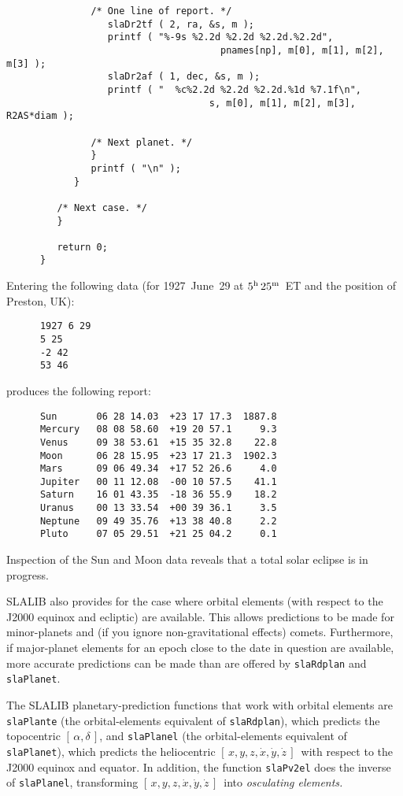 \documentclass[11pt,fleqn,twoside]{article}
\renewcommand{\_}{{\tt\char'137}}     %
\newcommand{\radec}     {$[\,\alpha,\delta\,]$}
\newcommand{\xyzxyzd}   {$[\,x,y,z,\dot{x},\dot{y},\dot{z}\,]$}
\begin{document}
\begin{verbatim}
               /* One line of report. */
                  slaDr2tf ( 2, ra, &s, m );
                  printf ( "%-9s %2.2d %2.2d %2.2d.%2.2d",
                                      pnames[np], m[0], m[1], m[2], m[3] );
                  slaDr2af ( 1, dec, &s, m );
                  printf ( "  %c%2.2d %2.2d %2.2d.%1d %7.1f\n",
                                    s, m[0], m[1], m[2], m[3], R2AS*diam );

               /* Next planet. */
               }
               printf ( "\n" );
            }

         /* Next case. */
         }

         return 0;
      }
\end{verbatim}
\vspace{-3ex}
\goodbreak
Entering the following data (for 1927~June~29 at $5^{\rm h}\,25^{\rm m}$~ET
and the position of Preston, UK):
\goodbreak
\vspace{-3ex}
\begin{verbatim}
      1927 6 29
      5 25
      -2 42
      53 46
\end{verbatim}
\vspace{-3ex}
\goodbreak
produces the following report:
\goodbreak
\vspace{-3ex}
\begin{verbatim}
      Sun       06 28 14.03  +23 17 17.3  1887.8
      Mercury   08 08 58.60  +19 20 57.1     9.3
      Venus     09 38 53.61  +15 35 32.8    22.8
      Moon      06 28 15.95  +23 17 21.3  1902.3
      Mars      09 06 49.34  +17 52 26.6     4.0
      Jupiter   00 11 12.08  -00 10 57.5    41.1
      Saturn    16 01 43.35  -18 36 55.9    18.2
      Uranus    00 13 33.54  +00 39 36.1     3.5
      Neptune   09 49 35.76  +13 38 40.8     2.2
      Pluto     07 05 29.51  +21 25 04.2     0.1
\end{verbatim}
\vspace{-3ex}
\goodbreak
Inspection of the Sun and Moon data reveals that
a total solar eclipse is in progress.
 
SLALIB also provides for the case where orbital elements (with respect
to the J2000 equinox and ecliptic)
are available.  This allows predictions to be made for minor-planets and
(if you ignore non-gravitational effects)
comets.  Furthermore, if major-planet elements for an epoch close to the date
in question are available, more accurate predictions can be made than
are offered by
{\tt slaRdplan} and
{\tt slaPlanet}.
 
The SLALIB planetary-prediction
functions that work with orbital elements are
{\tt slaPlante} (the orbital-elements equivalent of
{\tt slaRdplan}), which predicts the topocentric \radec, and
{\tt slaPlanel} (the orbital-elements equivalent of
{\tt slaPlanet}), which predicts the
heliocentric \xyzxyzd\ with respect to the
J2000 equinox and equator.  In addition, the function
{\tt slaPv2el} does the inverse of
{\tt slaPlanel}, transforming \xyzxyzd\ into {\it osculating elements.}
 
\end{document}
